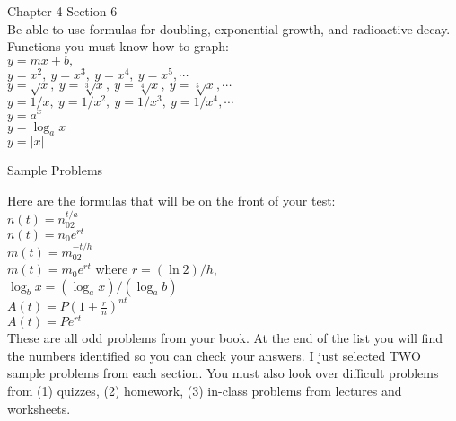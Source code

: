 \documentclass[11pt]{article}
\begin{document}
Chapter 4 Section 6\\
Be able to use formulas for doubling, exponential growth, and radioactive decay.\\

Functions you must know how to graph: \\
$y=mx+b,$ \\
$y=x^2,\:y=x^3,\:y=x^4,\:y=x^5, \cdots$\\
$y=\sqrt{x},\:y=\sqrt[3]{x},\:y=\sqrt[4]{x},\:y=\sqrt[5]{x},\cdots$\\
$y=1/x,\:y=1/x^2,\:y=1/x^3,\:y=1/x^4,\cdots$\\
$y=a^x$\\
$y=\log_a x$\\
$y=|x|$

\newpage

\begin{center}Sample Problems\end{center}

Here are the formulas that will be on the front of your test:\\
$n(t)=n_02^{t/a}$\\
$n(t)=n_0e^{rt}$\\
$m(t)=m_02^{-t/h}$\\
$m(t)=m_0e^{rt}$ where $r=(\ln 2)/h,$\\
$\log_b x = (\log_a x )/(\log_a b)$\\
$A(t)=P(1+\frac{r}{n})^{nt}$\\
$A(t)=Pe^{rt}$\\

These are all odd problems from your book. At the end of the list you will find the numbers identified so you can check your answers. I just selected TWO sample problems from each section. You must also look over difficult problems from (1) quizzes, (2) homework, (3) in-class problems from lectures and worksheets.\\
\end{document}
